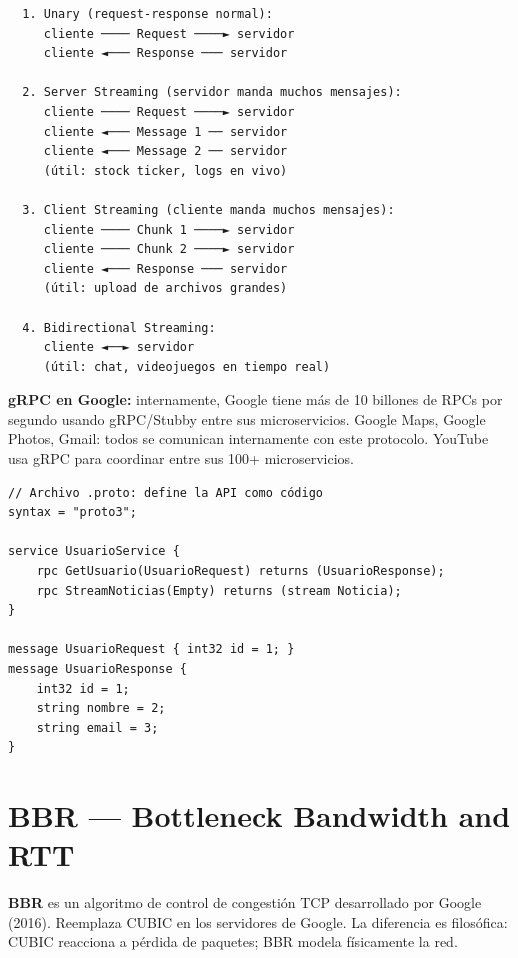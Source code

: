 \begin{lstlisting}
  1. Unary (request-response normal):
     cliente ──── Request ────► servidor
     cliente ◄─── Response ─── servidor

  2. Server Streaming (servidor manda muchos mensajes):
     cliente ──── Request ────► servidor
     cliente ◄─── Message 1 ── servidor
     cliente ◄─── Message 2 ── servidor
     (útil: stock ticker, logs en vivo)

  3. Client Streaming (cliente manda muchos mensajes):
     cliente ──── Chunk 1 ────► servidor
     cliente ──── Chunk 2 ────► servidor
     cliente ◄─── Response ─── servidor
     (útil: upload de archivos grandes)

  4. Bidirectional Streaming:
     cliente ◄──► servidor
     (útil: chat, videojuegos en tiempo real)
\end{lstlisting}

\begin{moderno}
\textbf{ gRPC en Google:} internamente, Google tiene más de
10 billones de RPCs por segundo usando gRPC/Stubby entre sus microservicios.
Google Maps, Google Photos, Gmail: todos se comunican internamente con este
protocolo. YouTube usa gRPC para coordinar entre sus 100+ microservicios.
\end{moderno}

\begin{codigo}
\begin{lstlisting}
// Archivo .proto: define la API como código
syntax = "proto3";

service UsuarioService {
    rpc GetUsuario(UsuarioRequest) returns (UsuarioResponse);
    rpc StreamNoticias(Empty) returns (stream Noticia);
}

message UsuarioRequest { int32 id = 1; }
message UsuarioResponse {
    int32 id = 1;
    string nombre = 2;
    string email = 3;
}
\end{lstlisting}
\end{codigo}

\section{ BBR --- Bottleneck Bandwidth and RTT}

\begin{concepto}
\textbf{BBR} es un algoritmo de control de congestión TCP desarrollado por
Google (2016). Reemplaza CUBIC en los servidores de Google. La diferencia
es filosófica: CUBIC reacciona a pérdida de paquetes; BBR modela físicamente
la red.
\end{concepto}

